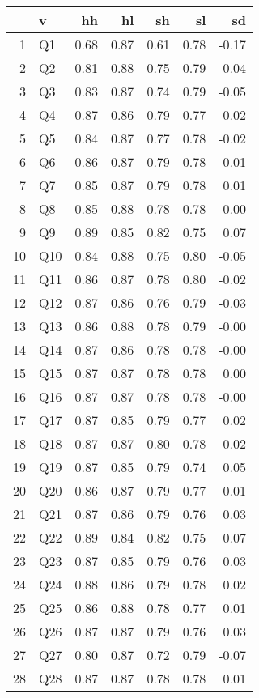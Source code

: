 \documentclass{amsart}
\begin{document}
\begin{longtable}{rlrrrrr}
  \hline
 & v & hh & hl & sh & sl & sd \\ 
  \hline
1 & Q1 & 0.68 & 0.87 & 0.61 & 0.78 & -0.17 \\ 
  2 & Q2 & 0.81 & 0.88 & 0.75 & 0.79 & -0.04 \\ 
  3 & Q3 & 0.83 & 0.87 & 0.74 & 0.79 & -0.05 \\ 
  4 & Q4 & 0.87 & 0.86 & 0.79 & 0.77 & 0.02 \\ 
  5 & Q5 & 0.84 & 0.87 & 0.77 & 0.78 & -0.02 \\ 
  6 & Q6 & 0.86 & 0.87 & 0.79 & 0.78 & 0.01 \\ 
  7 & Q7 & 0.85 & 0.87 & 0.79 & 0.78 & 0.01 \\ 
  8 & Q8 & 0.85 & 0.88 & 0.78 & 0.78 & 0.00 \\ 
  9 & Q9 & 0.89 & 0.85 & 0.82 & 0.75 & 0.07 \\ 
  10 & Q10 & 0.84 & 0.88 & 0.75 & 0.80 & -0.05 \\ 
  11 & Q11 & 0.86 & 0.87 & 0.78 & 0.80 & -0.02 \\ 
  12 & Q12 & 0.87 & 0.86 & 0.76 & 0.79 & -0.03 \\ 
  13 & Q13 & 0.86 & 0.88 & 0.78 & 0.79 & -0.00 \\ 
  14 & Q14 & 0.87 & 0.86 & 0.78 & 0.78 & -0.00 \\ 
  15 & Q15 & 0.87 & 0.87 & 0.78 & 0.78 & 0.00 \\ 
  16 & Q16 & 0.87 & 0.87 & 0.78 & 0.78 & -0.00 \\ 
  17 & Q17 & 0.87 & 0.85 & 0.79 & 0.77 & 0.02 \\ 
  18 & Q18 & 0.87 & 0.87 & 0.80 & 0.78 & 0.02 \\ 
  19 & Q19 & 0.87 & 0.85 & 0.79 & 0.74 & 0.05 \\ 
  20 & Q20 & 0.86 & 0.87 & 0.79 & 0.77 & 0.01 \\ 
  21 & Q21 & 0.87 & 0.86 & 0.79 & 0.76 & 0.03 \\ 
  22 & Q22 & 0.89 & 0.84 & 0.82 & 0.75 & 0.07 \\ 
  23 & Q23 & 0.87 & 0.85 & 0.79 & 0.76 & 0.03 \\ 
  24 & Q24 & 0.88 & 0.86 & 0.79 & 0.78 & 0.02 \\ 
  25 & Q25 & 0.86 & 0.88 & 0.78 & 0.77 & 0.01 \\ 
  26 & Q26 & 0.87 & 0.87 & 0.79 & 0.76 & 0.03 \\ 
  27 & Q27 & 0.80 & 0.87 & 0.72 & 0.79 & -0.07 \\ 
  28 & Q28 & 0.87 & 0.87 & 0.78 & 0.78 & 0.01 \\ 

\end{longtable}
\end{document}

